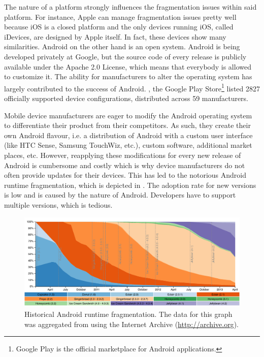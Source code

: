 The nature of a platform strongly influences the fragmentation issues within said platform. For instance, Apple can manage fragmentation issues pretty well because iOS is a closed platform and the only devices running iOS, called iDevices, are designed by Apple itself. In fact, these devices show many similarities. Android on the other hand is an open system. Android is being developed privately at Google, but the source code of every release is publicly available under the Apache 2.0 License, which means that everybody is allowed to customize it. The ability for manufacturers to alter the operating system has largely contributed to the success of Android. , the Google Play Store\footnote{Google Play is the official marketplace for Android applications.} listed 2827 officially supported device configurations, distributed across 59 manufacturers. 

Mobile device manufacturers are eager to modify the Android operating system to differentiate their product from their competitors. As such, they create their own Android flavour, i.e. a distribution of Android with a custom user interface (like HTC Sense, Samsung TouchWiz, etc.), custom software, additional market places, etc. However, reapplying these modifications for every new release of Android is cumbersome and costly which is why device manufacturers do not often provide updates for their devices. This has led to the notorious Android runtime fragmentation, which is depicted in . The adoption rate for new versions is low and is caused by the nature of Android. Developers have to support multiple versions, which is tedious. 

\begin{figure}[h]
    \begin{center}
        \includegraphics[width=\textwidth]{figs/android_runtimes.pdf}
        \caption{Historical Android runtime fragmentation. The data for this graph was aggregated from \cite{Android:Versions} using the Internet Archive (\url{http://archive.org}).}
        \label{fig:android_runtimes}
    \end{center}
\end{figure}

